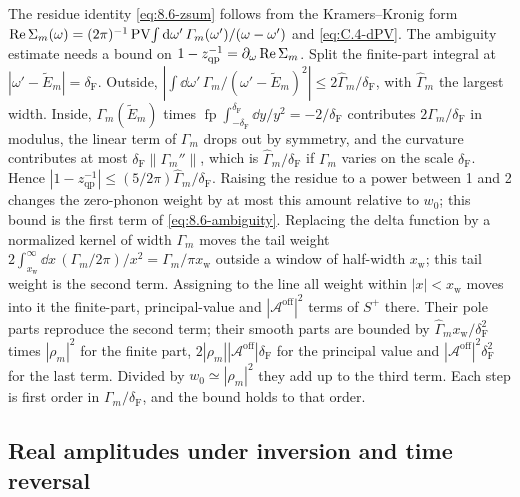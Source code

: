 The residue identity \cref{eq:8.6-zsum} follows from the Kramers--Kronig form $\operatorname{Re}\Sigma_m(\omega) = (2\pi)^{-1}\operatorname{PV}\!\int\mathrm{d}\omega'\,\varGamma_m(\omega')/(\omega - \omega')$ and \cref{eq:C.4-dPV}. The ambiguity estimate needs a bound on $1 - z_{\mathrm{qp}}^{-1} = \partial_\omega\operatorname{Re}\Sigma_m$. Split the finite-part integral at $|\omega' - \tilde E_m| = \delta_{\mathrm{F}}$. Outside, $|\int\dd\omega'\,\varGamma_m/(\omega' - \tilde E_m)^2| \le 2\hat\varGamma_m/\delta_{\mathrm{F}}$, with $\hat\varGamma_m$ the largest width. Inside, $\varGamma_m(\tilde E_m)$ times $\operatorname{fp}\!\int_{-\delta_{\mathrm{F}}}^{\delta_{\mathrm{F}}}\dd y/y^2 = -2/\delta_{\mathrm{F}}$ contributes $2\varGamma_m/\delta_{\mathrm{F}}$ in modulus, the linear term of $\varGamma_m$ drops out by symmetry, and the curvature contributes at most $\delta_{\mathrm{F}}\|\varGamma_m''\|$, which is $\hat\varGamma_m/\delta_{\mathrm{F}}$ if $\varGamma_m$ varies on the scale $\delta_{\mathrm{F}}$. Hence $|1 - z_{\mathrm{qp}}^{-1}| \le (5/2\pi)\hat\varGamma_m/\delta_{\mathrm{F}}$. Raising the residue to a power between 1 and 2 changes the zero-phonon weight by at most this amount relative to $w_0$; this bound is the first term of \cref{eq:8.6-ambiguity}. Replacing the delta function by a normalized kernel of width $\varGamma_m$ moves the tail weight $2\int_{x_{\mathrm{w}}}^\infty\dd x\,(\varGamma_m/2\pi)/x^2 = \varGamma_m/\pi x_{\mathrm{w}}$ outside a window of half-width $x_{\mathrm{w}}$; this tail weight is the second term. Assigning to the line all weight within $|x| < x_{\mathrm{w}}$ moves into it the finite-part, principal-value and $|\mathcal{A}^{\mathrm{off}}|^2$ terms of $S^+$ there. Their pole parts reproduce the second term; their smooth parts are bounded by $\hat\varGamma_mx_{\mathrm{w}}/\delta_{\mathrm{F}}^2$ times $|\rho_m|^2$ for the finite part, $2|\rho_m||\mathcal{A}^{\mathrm{off}}|\delta_{\mathrm{F}}$ for the principal value and $|\mathcal{A}^{\mathrm{off}}|^2\delta_{\mathrm{F}}^2$ for the last term. Divided by $w_0 \simeq |\rho_m|^2$ they add up to the third term. Each step is first order in $\varGamma_m/\delta_{\mathrm{F}}$, and the bound holds to that order.

\subsection{Real amplitudes under inversion and time reversal}

